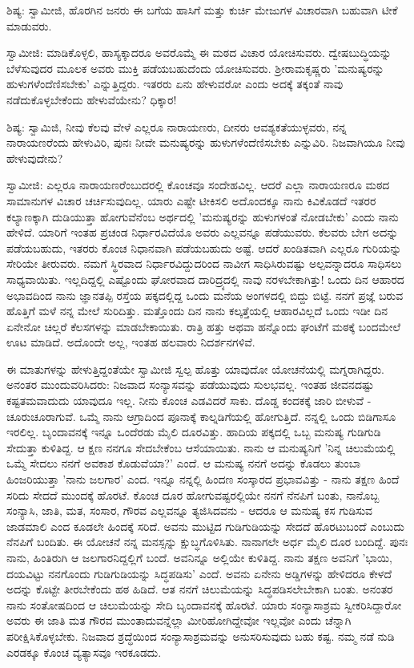 ಶಿಷ್ಯ: ಸ್ವಾಮೀಜಿ, ಹೊರಗಿನ ಜನರು ಈ ಬಗೆಯ ಹಾಸಿಗೆ ಮತ್ತು ಕುರ್ಚಿ ಮೇಜುಗಳ ವಿಚಾರವಾಗಿ ಬಹುವಾಗಿ ಟೀಕೆ ಮಾಡುವರು.

ಸ್ವಾಮೀಜಿ: ಮಾಡಿಕೊಳ್ಳಲಿ, ಹಾಸ್ಯಕ್ಕಾದರೂ ಅವರೊಮ್ಮೆ ಈ ಮಠದ ವಿಚಾರ ಯೋಚಿಸುವರು. ದ್ವೇಷಬುದ್ಧಿಯನ್ನು ಬೆಳೆಸುವುದರ ಮೂಲಕ ಅವರು ಮುಕ್ತಿ ಪಡೆಯಬಹುದೆಂದು ಯೋಚಿಸುವರು. ಶ‍್ರೀರಾಮಕೃಷ್ಣರು 'ಮನುಷ್ಯರನ್ನು ಹುಳುಗಳೆಂದೆಣಿಸಬೇಕು' ಎನ್ನುತ್ತಿದ್ದರು. ಇತರರು ಏನು ಹೇಳುವರೋ ಎಂದು ಅದಕ್ಕೆ ತಕ್ಕಂತೆ ನಾವು ನಡೆದುಕೊಳ್ಳಬೇಕೆಂದು ಹೇಳುವೆಯೇನು? ಧಿಕ್ಕಾರ!

ಶಿಷ್ಯ: ಸ್ವಾಮಿಜಿ, ನೀವು ಕೆಲವು ವೇಳೆ ಎಲ್ಲರೂ ನಾರಾಯಣರು, ದೀನರು ಆವಶ್ಯಕತೆಯುಳ್ಳವರು, ನನ್ನ ನಾರಾಯಣರೆಂದು ಹೇಳುವಿರಿ, ಪುನಃ ನೀವೇ ಮನುಷ್ಯರನ್ನು ಹುಳುಗಳೆಂದೆಣಿಸಬೇಕು ಎನ್ನುವಿರಿ. ನಿಜವಾಗಿಯೂ ನೀವು ಹೇಳುವುದೇನು?

ಸ್ವಾಮೀಜಿ: ಎಲ್ಲರೂ ನಾರಾಯಣರೆಂಬುದರಲ್ಲಿ ಕೊಂಚವೂ ಸಂದೇಹವಿಲ್ಲ. ಆದರೆ ಎಲ್ಲಾ ನಾರಾಯಣರೂ ಮಠದ ಸಾಮಾನುಗಳ ವಿಚಾರ ಚರ್ಚಿಸುವುದಿಲ್ಲ. ಯಾರು ಎಷ್ಟೇ ಟೀಕಿಸಲಿ ಅದೊಂದಕ್ಕೂ ನಾನು ಕಿವಿಕೊಡದೆ ಇತರರ ಕಲ್ಯಾಣಕ್ಕಾಗಿ ದುಡಿಯುತ್ತಾ ಹೋಗುವೆನೆಂಬ ಅರ್ಥದಲ್ಲಿ 'ಮನುಷ್ಯರನ್ನು ಹುಳುಗಳಂತೆ ನೋಡಬೇಕು' ಎಂದು ನಾನು ಹೇಳಿದೆ. ಯಾರಿಗೆ ಇಂತಹ ಪ್ರಚಂಡ ನಿರ್ಧಾರವಿದೆಯೊ ಅವರು ಎಲ್ಲವನ್ನೂ ಪಡೆಯುವರು. ಕೆಲವರು ಬೇಗ ಅದನ್ನು ಪಡೆಯಬಹುದು, ಇತರರು ಕೊಂಚ ನಿಧಾನವಾಗಿ ಪಡೆಯಬಹುದು ಅಷ್ಟೆ. ಆದರೆ ಖಂಡಿತವಾಗಿ ಎಲ್ಲರೂ ಗುರಿಯನ್ನು ಸೇರಿಯೇ ತೀರುವರು. ನಮಗೆ ಸ್ಥಿರವಾದ ನಿರ್ಧಾರವಿದ್ದುದರಿಂದ ನಾವೀಗ ಸಾಧಿಸಿರುವಷ್ಟು ಅಲ್ಪವನ್ನಾದರೂ ಸಾಧಿಸಲು ಸಾಧ್ಯವಾಯಿತು. ಇಲ್ಲದಿದ್ದಲ್ಲಿ ಎಷ್ಟೊಂದು ಘೋರವಾದ ದಾರಿದ್ರ್ಯದಲ್ಲಿ ನಾವು ನರಳಬೇಕಾಗಿತ್ತು! ಒಂದು ದಿನ ಆಹಾರದ ಅಭಾವದಿಂದ ನಾನು ಜ್ಞಾನತಪ್ಪಿ ರಸ್ತೆಯ ಪಕ್ಕದಲ್ಲಿದ್ದ ಒಂದು ಮನೆಯ ಅಂಗಳದಲ್ಲಿ ಬಿದ್ದು ಬಿಟ್ಟೆ. ನನಗೆ ಪ್ರಜ್ಞೆ ಬರುವ ಹೊತ್ತಿಗೆ ಮಳೆ ನನ್ನ ಮೇಲೆ ಸುರಿದಿತ್ತು. ಮತ್ತೊಂದು ದಿನ ನಾನು ಕಲ್ಕತ್ತೆಯಲ್ಲಿ ಆಹಾರವಿಲ್ಲದೆ ಒಂದು ಇಡೀ ದಿನ ಏನೇನೋ ಚಿಲ್ಲರೆ ಕೆಲಸಗಳನ್ನು ಮಾಡಬೇಕಾಯಿತು. ರಾತ್ರಿ ಹತ್ತು ಅಥವಾ ಹನ್ನೊಂದು ಘಂಟೆಗೆ ಮಠಕ್ಕೆ ಬಂದಮೇಲೆ ಊಟ ಮಾಡಿದೆ. ಅದೊಂದೇ ಅಲ್ಲ, ಇಂತಹ ಹಲವಾರು ನಿದರ್ಶನಗಳಿವೆ.

ಈ ಮಾತುಗಳನ್ನು ಹೇಳುತ್ತಿದ್ದಂತೆಯೇ ಸ್ವಾಮೀಜಿ ಸ್ವಲ್ಪ ಹೊತ್ತು ಯಾವುದೋ ಯೋಚನೆಯಲ್ಲಿ ಮಗ್ನರಾಗಿದ್ದರು. ಅನಂತರ ಮುಂದುವರಿಸಿದರು: ನಿಜವಾದ ಸಂನ್ಯಾಸವನ್ನು ಪಡೆಯುವುದು ಸುಲಭವಲ್ಲ. ಇಂತಹ ಜೀವನದಷ್ಟು ಕಷ್ಟತಮವಾದುದು ಯಾವುದೂ ಇಲ್ಲ. ನೀನು ಕೊಂಚ ಎಡವಿದರೆ ಸಾಕು. ದೊಡ್ಡ ಕಂದಕಕ್ಕೆ ಜಾರಿ ಬೀಳುವೆ - ಚೂರುಚೂರಾಗುವೆ. ಒಮ್ಮೆ ನಾನು ಆಗ್ರಾದಿಂದ ಪೂನಾಕ್ಕೆ ಕಾಲ್ನಡಿಗೆಯಲ್ಲಿ ಹೋಗುತ್ತಿದೆ. ನನ್ನಲ್ಲಿ ಒಂದು ಬಿಡಿಗಾಸೂ ಇರಲಿಲ್ಲ. ಬೃಂದಾವನಕ್ಕೆ ಇನ್ನೂ ಒಂದೆರಡು ಮೈಲಿ ದೂರವಿತ್ತು. ಹಾದಿಯ ಪಕ್ಕದಲ್ಲಿ ಒಬ್ಬ ಮನುಷ್ಯ ಗುಡಿಗುಡಿ ಸೇದುತ್ತಾ ಕುಳಿತಿದ್ದ. ಆ ಕ್ಷಣ ನನಗೂ ಸೇದಬೇಕೆಂಬ ಆಸೆಯಾಯಿತು. ನಾನು ಆ ಮನುಷ್ಯನಿಗೆ 'ನಿನ್ನ ಚಿಲುಮೆಯಲ್ಲಿ ಒಮ್ಮೆ ಸೇದಲು ನನಗೆ ಅವಕಾಶ ಕೊಡುವೆಯಾ?' ಎಂದೆ. ಆ ಮನುಷ್ಯ ನನಗೆ ಅದನ್ನು ಕೊಡಲು ತುಂಬಾ ಹಿಂಜರಿಯುತ್ತಾ 'ನಾನು ಜಲಗಾರ' ಎಂದ. ಇನ್ನೂ ನನ್ನಲ್ಲಿ ಹಿಂದಣ ಸಂಸ್ಕಾರದ ಪ್ರಭಾವವಿತ್ತು - ನಾನು ತಕ್ಷಣ ಹಿಂದೆ ಸರಿದು ಸೇದದೆ ಮುಂದಕ್ಕೆ ಹೊರಟೆ. ಕೊಂಚ ದೂರ ಹೋಗುವಷ್ಟರಲ್ಲಿಯೇ ನನಗೆ ನೆನಪಿಗೆ ಬಂತು, ನಾನೊಬ್ಬ ಸಂನ್ಯಾಸಿ, ಜಾತಿ, ಮತ, ಸಂಸಾರ, ಗೌರವ ಎಲ್ಲವನ್ನೂ ತ್ಯಜಿಸಿದವನು - ಆದರೂ ಆ ಮನುಷ್ಯ ಕಸ ಗುಡಿಸುವ ಜಾಡಮಾಲಿ ಎಂದ ಕೂಡಲೇ ಹಿಂದಕ್ಕೆ ಸರಿದೆ. ಅವನು ಮುಟ್ಟಿದ ಗುಡಿಗುಡಿಯನ್ನು ಸೇದದೆ ಹೊರಟುಬಂದೆ ಎಂಬುದು ನೆನಪಿಗೆ ಬಂದಿತು. ಈ ಯೋಚನೆ ನನ್ನ ಮನಸ್ಸನ್ನು ಕ್ಷುಬ್ಧಗೊಳಿಸಿತು. ನಾನಾಗಲೇ ಅರ್ಧ ಮೈಲಿ ದೂರ ಬಂದಿದ್ದೆ. ಪುನಃ ನಾನು, ಹಿಂತಿರುಗಿ ಆ ಜಲಗಾರನಿದ್ದಲ್ಲಿಗೆ ಬಂದೆ. ಅವನಿನ್ನೂ ಅಲ್ಲಿಯೇ ಕುಳಿತಿದ್ದ. ನಾನು ತಕ್ಷಣ ಅವನಿಗೆ 'ಭಾಯಿ, ದಯವಿಟ್ಟು ನನಗೊಂದು ಗುಡಿಗುಡಿಯನ್ನು ಸಿದ್ಧಪಡಿಸು' ಎಂದೆ. ಅವನು ಏನೇನು ಅಡ್ಡಿಗಳನ್ನು ಹೇಳಿದರೂ ಕೇಳದೆ ಅದನ್ನು ಕೊಟ್ಟೇ ತೀರಬೇಕೆಂದು ಹಠ ಹಿಡಿದೆ. ಆತ ನನಗೆ ಚಿಲುಮೆಯನ್ನು ಸಿದ್ಧಪಡಿಸಲೇಬೇಕಾಗಿ ಬಂತು. ಅನಂತರ ನಾನು ಸಂತೋಷದಿಂದ ಆ ಚಿಲುಮೆಯನ್ನು ಸೇದಿ ಬೃಂದಾವನಕ್ಕೆ ಹೊರಟೆ. ಯಾರು ಸಂನ್ಯಾಸಾಶ್ರಮ ಸ್ವೀಕರಿಸಿದ್ದಾರೋ ಅವರು ಈ ಜಾತಿ ಮತ ಗೌರವ ಮುಂತಾದುವನ್ನೆಲ್ಲಾ ಮೀರಿಹೋಗಿದ್ದೇವೋ ಇಲ್ಲವೋ ಎಂದು ಚೆನ್ನಾಗಿ ಪರೀಕ್ಷಿಸಿಕೊಳ್ಳಬೇಕು. ನಿಜವಾದ ಶ್ರದ್ಧೆಯಿಂದ ಸಂನ್ಯಾಸಾಶ್ರಮವನ್ನು ಅನುಸರಿಸುವುದು ಬಹು ಕಷ್ಟ. ನಮ್ಮ ನಡೆ ನುಡಿ ಎರಡಕ್ಕೂ ಕೊಂಚ ವ್ಯತ್ಯಾಸವೂ ಇರಕೂಡದು.

